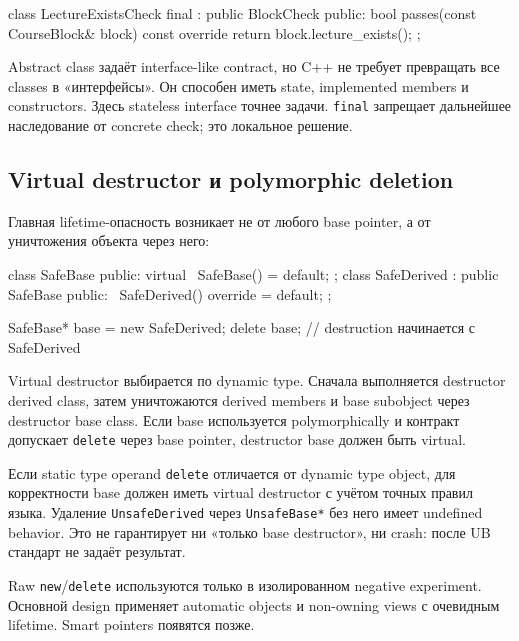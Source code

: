 \begin{cppcode}
class LectureExistsCheck final : public BlockCheck {
public:
    bool passes(const CourseBlock& block) const override {
        return block.lecture_exists();
    }
};
\end{cppcode}

Abstract class задаёт interface-like contract, но C++ не требует превращать
все classes в «интерфейсы». Он способен иметь state, implemented members и
constructors. Здесь stateless interface точнее задачи. \texttt{final}
запрещает дальнейшее наследование от concrete check; это локальное решение.

\subsection{Virtual destructor и polymorphic deletion}

Главная lifetime-опасность возникает не от любого base pointer, а от
уничтожения объекта через него:

\begin{cppcode}
class SafeBase {
public:
    virtual ~SafeBase() = default;
};
class SafeDerived : public SafeBase {
public:
    ~SafeDerived() override = default;
};

SafeBase* base = new SafeDerived;
delete base; // destruction начинается с SafeDerived
\end{cppcode}

Virtual destructor выбирается по dynamic type. Сначала выполняется destructor
derived class, затем уничтожаются derived members и base subobject через
destructor base class. Если base используется
polymorphically и контракт допускает \texttt{delete} через base pointer,
destructor base должен быть virtual.

\begin{ubbox}
Если static type operand \texttt{delete} отличается от dynamic type object,
для корректности base должен иметь virtual destructor с учётом точных правил
языка. Удаление \texttt{UnsafeDerived} через \texttt{UnsafeBase*} без него
имеет undefined behavior. Это не гарантирует ни «только base destructor», ни
crash: после UB стандарт не задаёт результат.
\end{ubbox}

Raw \texttt{new}/\texttt{delete} используются только в изолированном negative
experiment. Основной design применяет automatic objects и non-owning views с
очевидным lifetime. Smart pointers появятся позже.

